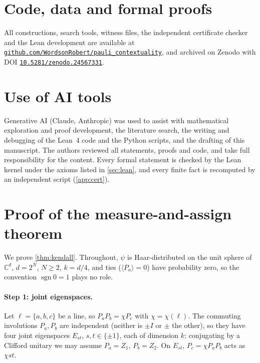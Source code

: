 \documentclass[a4paper,onecolumn,11pt,unpublished,nopdfoutputerror]{quantumarticle}
\theoremstyle{definition}
\newcommand{\C}{\mathbb{C}}
\newcommand{\sgn}{\operatorname{sgn}}
\newcommand{\ev}[1]{\langle #1\rangle}
\newcommand{\repourl}{https://github.com/WordsonRobert/pauli_contextuality}
\newcommand{\repo}{\href{\repourl}{\nolinkurl{github.com/WordsonRobert/pauli_contextuality}}}
\begin{document}
\section*{Code, data and formal proofs}
All constructions, search tools, witness files, the independent certificate checker and the Lean development are
available at \repo, and archived on Zenodo with DOI
\href{https://doi.org/10.5281/zenodo.24567331}{\nolinkurl{10.5281/zenodo.24567331}}.

\section*{Use of AI tools}
Generative AI (Claude, Anthropic) was used to assist with mathematical exploration and proof development, the
literature search, the writing and debugging of the Lean~4 code and the Python scripts, and the drafting of this
manuscript. The authors reviewed all statements, proofs and code, and take full responsibility for the content.
Every formal statement is checked by the Lean kernel under the axioms listed in \cref{sec:lean}, and every finite
fact is recomputed by an independent script (\cref{app:cert}).


\appendix
\section{Proof of the measure-and-assign theorem}\label{app:kendall}

We prove \cref{thm:kendall}. Throughout, $\psi$ is Haar-distributed on the unit sphere of $\C^d$, $d=2^N$,
$N\ge2$, $k=d/4$, and ties ($\ev{P_a}=0$) have probability zero, so the convention $\sgn0=1$ plays no role.

\paragraph{Step 1: joint eigenspaces.}
Let $\ell=\{a,b,c\}$ be a line, so $P_aP_b=\chi P_c$ with $\chi=\chi(\ell)$. The commuting involutions $P_a,P_b$ are
independent (neither is $\pm I$ or $\pm$ the other), so they have four joint eigenspaces $E_{st}$, $s,t\in\{\pm1\}$,
each of dimension $k$: conjugating by a Clifford unitary we may assume $P_a=Z_1$, $P_b=Z_2$. On $E_{st}$, $P_c=\chi
P_aP_b$ acts as $\chi st$.
\end{document}

